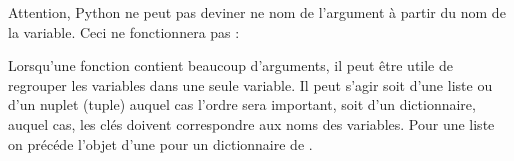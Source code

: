 \documentclass[letterpaper,10pt,english]{sphinxhowto}
\begin{document}
\begin{sphinxVerbatim}[commandchars=\\\{\}]
     
\end{sphinxVerbatim}

\sphinxAtStartPar
Attention, Python ne peut pas deviner ne nom de l’argument à partir du nom de la variable. Ceci ne fonctionnera pas :

\begin{sphinxVerbatim}[commandchars=\\\{\}]

  
\end{sphinxVerbatim}

\sphinxAtStartPar
Lorsqu’une fonction contient beaucoup d’arguments, il peut être utile de regrouper les variables dans une seule variable. Il peut s’agir soit d’une liste ou d’un n\sphinxhyphen{}uplet (tuple) auquel cas l’ordre sera important, soit d’un dictionnaire, auquel cas, les clés doivent correspondre aux noms des variables. Pour une liste on précéde l’objet d’une \sphinxcode{\sphinxupquote{*}} pour un dictionnaire de \sphinxcode{\sphinxupquote{**}}.

\begin{sphinxVerbatim}[commandchars=\\\{\}]
    
    

\end{sphinxVerbatim}
\end{document}

